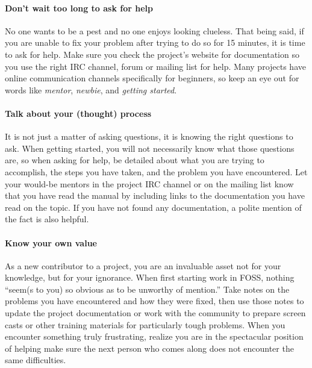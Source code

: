 \paragraph*{Don’t wait too long to ask for help} No one wants to be a pest and no one enjoys looking clueless. That being said, if you are unable to fix your problem after trying to do so for 15 minutes, it is time to ask for help. Make sure you check the project’s website for documentation so you use the right IRC channel, forum or mailing list for help. Many projects have online communication channels specifically for beginners, so keep an eye out for words like \textit{mentor}, \textit{newbie}, and \textit{getting started}.

\paragraph*{Talk about your (thought) process} It is not just a matter of asking questions, it is knowing the right questions to ask. When getting started, you will not necessarily know what those questions are, so when asking for help, be detailed about what you are trying to accomplish, the steps you have taken, and the problem you have encountered. Let your would-be mentors in the project IRC channel or on the mailing list know that you have read the manual by including links to the documentation you have read on the topic. If you have not found any documentation, a polite mention of the fact is also helpful.

\paragraph*{Know your own value} As a new contributor to a project, you are an invaluable asset not for your knowledge, but for your ignorance. When first starting work in FOSS, nothing ``seem(s to you) so obvious as to be unworthy of mention.'' Take notes on the problems you have encountered and how they were fixed, then use those notes to update the project documentation or work with the community to prepare screen casts or other training materials for particularly tough problems. When you encounter something truly frustrating, realize you are in the spectacular position of helping make sure the next person who comes along does not encounter the same difficulties.
